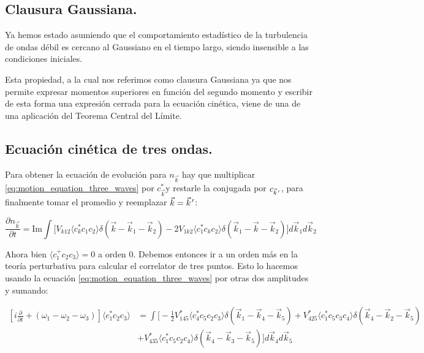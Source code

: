 \subsection*{Clausura Gaussiana.}
Ya hemos estado asumiendo que el comportamiento estadístico de la turbulencia de ondas débil es cercano al Gaussiano en el tiempo largo, siendo insensible a las condiciones iniciales. \cite{falconLaboratoryExperimentsWave2010} 

Esta propiedad, a la cual nos referimos como clausura Gaussiana ya que nos permite expresar momentos superiores en función del segundo momento y escribir de esta forma una expresión cerrada para la ecuación cinética, viene de una de una aplicación del Teorema Central del Límite. \cite{hasselmannNonlinearEnergyTransfer1962} 


\subsection*{Ecuación cinética de tres ondas.}
Para obtener la ecuación de evolución para $n_{\vec k}$ hay que multiplicar \eqref{eq:motion_equation_three_waves} por $c^*_{\vec k}$y restarle la conjugada por $c_{\pvec k'}$, para finalmente tomar el promedio y reemplazar $\vec k=\pvec k'$:

\begin{equation}
	\frac{\partial n_{\vec k}}{\partial t} = \text{Im} \int\big[V_{k12} \langle c_k^*c_1c_2 \rangle \delta(\vec k- \vec k_1 -\vec k_2) - 2V_{1k2}\langle c_1^*c_kc_2 \rangle \delta(\vec k_1 - \vec k - \vec k_2) \big] d\vec k_1 d\vec k_2
\end{equation} 

Ahora bien $\langle c_1^+c_2c_3 \rangle = 0$ a orden 0. Debemos entonces ir a un orden más en la teoría perturbativa para calcular el correlator de tres puntos. Esto lo hacemos usando la ecuación \eqref{eq:motion_equation_three_waves} por otras dos amplitudes y sumando:

\begin{equation}
	\begin{split}
		\left[i\frac{\partial}{\partial t} + (\omega_1-\omega_2-\omega_3)\right] \langle c_1^*c_2c_3 \rangle &= \int \bigg[-\frac{1}{2}V_{145}^*\langle c_4^*c_5c_2c_3 \rangle \delta(\vec k_1 - \vec k_4 -\vec k_5) + V_{425}^*\langle c_1^*c_5c_3c_4 \rangle \delta(\vec k_4 - \vec k_2 -\vec k_5) \\ 
		&+  V_{435}^*\langle c_1^*c_5c_2c_4 \rangle \delta(\vec k_4 - \vec k_3 -\vec k_5)\bigg] d\vec k_4 d\vec k_5
	\end{split}
\end{equation}


